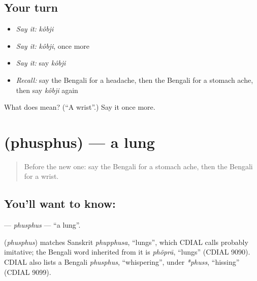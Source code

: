 \subsection*{Your turn}
\begin{itemize}
\raggedright
  \item \emph{Say it:} \emph{kôbji}
  \item \emph{Say it:} \emph{kôbji}, once more
  \item \emph{Say it:} say \emph{kôbji}
  \item \emph{Recall:} say the Bengali for a headache, then the Bengali for a stomach ache, then say \emph{kôbji} again
\end{itemize}

\begin{tcolorbox}[breakable,colback=teal!4,colframe=teal!35!black,title={Before you move on}]
What does  mean? (\textquotedblleft{}A wrist\textquotedblright{}.) Say it once more.
\end{tcolorbox}
\section[\texorpdfstring{\bn{ফুসফুস} (phusphus)}{ফুসফুস (phusphus)}]{ (phusphus) — a lung}

\label{lesson:BN-C155-phusphus}



\begin{quote}
Before the new one: say the Bengali for a stomach ache, then the Bengali for a wrist.
\end{quote}

\subsection*{You'll want to know: }
\textbf{} — \emph{phusphus} — \textquotedblleft{}a lung\textquotedblright{}.

\begin{cousinweb}
\textbf{} (\emph{phusphus}) matches Sanskrit \emph{phupphusa}, \textquotedblleft{}lungs\textquotedblright{}, which CDIAL calls probably imitative; the Bengali word inherited from it is \emph{phõprā}, \textquotedblleft{}lungs\textquotedblright{} (CDIAL 9090). CDIAL also lists a Bengali \emph{phusphus}, \textquotedblleft{}whispering\textquotedblright{}, under \emph{*phuss}, \textquotedblleft{}hissing\textquotedblright{} (CDIAL 9099).
\end{cousinweb}

